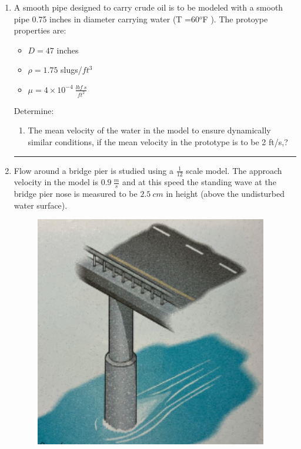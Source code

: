 \documentclass[12pt]{article}
\begin{document}
\begin{enumerate}
\item A smooth pipe designed to carry crude oil is to be modeled with a smooth pipe 0.75 inches in diameter carrying water (T =60$^o$F ).
The protoype properties are:
\begin{itemize}
\item $D = 47$ inches
\item $\rho= 1.75$ slugs/$ft^3$
\item $\mu=4 \times 10^{-4} ~ \frac{lbf~s}{ft^2}$ 
\end{itemize}
Determine:
\begin{enumerate}
\item  The mean velocity of the water in the model to ensure dynamically similar conditions, if the mean velocity in the prototype is to be 2 ft/s,?
\end{enumerate}
\noindent\rule{\linewidth}{0.4pt}
\clearpage
\item Flow around a bridge pier is studied using a $\frac{1}{12}$ scale model.  
The approach velocity in the model is $0.9~\frac{m}{s}$ and at this speed the standing wave at the bridge pier nose is measured to be $2.5~cm$ in height (above the undisturbed water surface).

\begin{figure}[htbp] %
   \centering
   \includegraphics[width=4in]{bridge_pier.png} 
   \caption{}
   \label{fig:bridge_pier}
\end{figure}


\end{enumerate}
\end{document}
